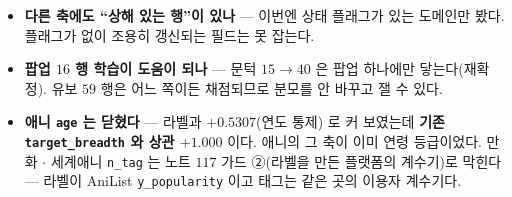 \documentclass[11pt]{article}
\begin{document}
\begin{itemize}
\item \textbf{다른 축에도 ``상해 있는 행''이 있나} --- 이번엔 상태 플래그가
있는 도메인만 봤다. 플래그가 없이 조용히 갱신되는 필드는 못 잡는다.
\item \textbf{팝업 $16$ 행 학습이 도움이 되나} --- 문턱 $15\!\to\!40$ 은
팝업 하나에만 닿는다(재확정). 유보 $59$ 행은 어느 쪽이든 채점되므로 분모를
안 바꾸고 잴 수 있다.
\item \textbf{애니 \texttt{age} 는 닫혔다} --- 라벨과 $+0.5307$(연도 통제)
로 커 보였는데 \textbf{기존 \texttt{target\_breadth} 와 상관 $+1.000$} 이다.
애니의 그 축이 이미 연령 등급이었다. 만화 $\cdot$ 세계애니 \texttt{n\_tag}
는 노트 $117$ 가드 ②(라벨을 만든 플랫폼의 계수기)로 막힌다 --- 라벨이
AniList \texttt{y\_popularity} 이고 태그는 같은 곳의 이용자 계수기다.
\end{itemize}
\end{document}
